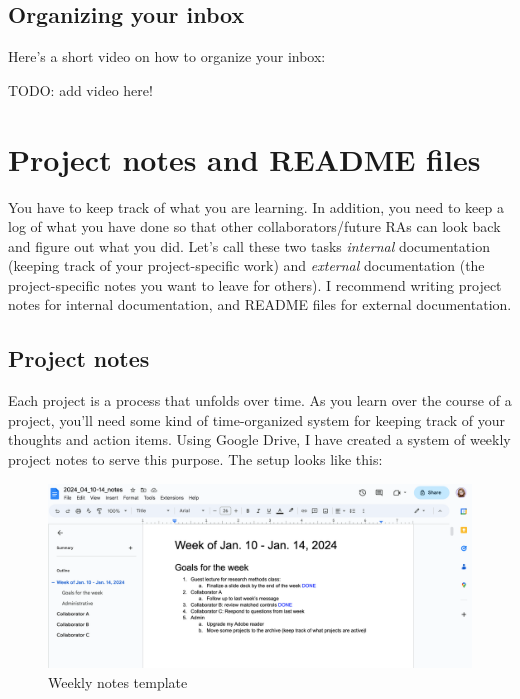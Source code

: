 \documentclass[
]{book}
\begin{document}
\hypertarget{organizing-your-inbox}{%
\subsection{Organizing your inbox}\label{organizing-your-inbox}}

Here's a short video on how to organize your inbox:

TODO: add video here!

\hypertarget{project-notes}{%
\section{Project notes and README files}\label{project-notes}}

You have to keep track of what you are learning. In addition, you need to keep a log of what you have done so that other collaborators/future RAs can look back and figure out what you did. Let's call these two tasks \emph{internal} documentation (keeping track of your project-specific work) and \emph{external} documentation (the project-specific notes you want to leave for others). I recommend writing project notes for internal documentation, and README files for external documentation.

\hypertarget{project-notes-1}{%
\subsection{Project notes}\label{project-notes-1}}

Each project is a process that unfolds over time. As you learn over the course of a project, you'll need some kind of time-organized system for keeping track of your thoughts and action items. Using Google Drive, I have created a system of weekly project notes to serve this purpose. The setup looks like this:

\begin{figure}
\centering
\includegraphics{img/weekly_notes.png}
\caption{Weekly notes template}
\end{figure}
\end{document}
